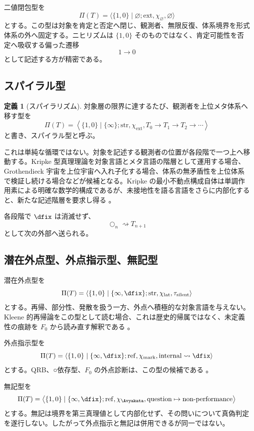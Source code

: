 \documentclass[a4paper,11pt]{ltjsarticle}
\theoremstyle{definition}
\newtheorem{definition}{定義}[section]
\theoremstyle{plain}
\newcommand{\Phase}{\Pi}
\begin{document}
二値閉包型を
\[
 \Phase(T)=
 \langle\{1,0\}\mid\varnothing;
 \mathrm{ext},\chi_{\varnothing},\varnothing\rangle
\]
とする。この型は対象を肯定と否定へ閉じ、観測者、無限反復、体系境界を形式体系の外へ固定する。ニヒリズムは $\{1,0\}$ そのものではなく、肯定可能性を否定へ吸収する偏った遷移
\[
 1\longrightarrow0
\]
として記述する方が精密である。

\subsection{スパイラル型}

\begin{definition}[スパイラリズム]
対象層の限界に達するたび、観測者を上位メタ体系へ移す型を
\[
 \Phase(T)=
 \left\langle
 \{1,0\}\mid\{\infty\};
 \mathrm{str},\chi_{\mathrm{ext}},
 T_0\to T_1\to T_2\to\cdots
 \right\rangle
\]
と書き、スパイラル型と呼ぶ。
\end{definition}

これは単純な循環ではない。対象を記述する観測者の位置が各段階で一つ上へ移動する。Kripke 型真理理論を対象言語とメタ言語の階層として運用する場合、Grothendieck 宇宙を上位宇宙へ入れ子化する場合、体系の無矛盾性を上位体系で検証し続ける場合などが候補となる。Kripke の最小不動点構成自体は単調作用素による明確な数学的構成であるが、未接地性を語る言語をさらに内部化すると、新たな記述階層を要求し得る \cite{kripke}。

各段階で $\dfix$ は消滅せず、
\[
 \bigcirc_n\rightsquigarrow T_{n+1}
\]
として次の外部へ送られる。

\subsection{潜在外点型、外点指示型、無記型}

潜在外点型を
\[
 \Phase(T)=
 \langle\{1,0\}\mid\{\infty,\dfix\};
 \mathrm{str},\chi_{\mathrm{lat}},\tau_{\mathrm{silent}}\rangle
\]
とする。再帰、部分性、発散を扱う一方、外点へ積極的な対象言語を与えない。Kleene 的再帰論をこの型として読む場合、これは歴史的帰属ではなく、未定義性の痕跡を $F_0$ から読み直す解釈である \cite{kleene}。

外点指示型を
\[
 \Phase(T)=
 \langle\{1,0\}\mid\{\infty,\dfix\};
 \mathrm{ref},\chi_{\mathrm{mark}},
 \mathrm{internal}\rightsquigarrow\dfix\rangle
\]
とする。QRB、○依存型、$F_0$ の外点診断は、この型の候補である \cite{ChibaQRB2026,ChibaEPMDTT2026,ChibaF02026}。

無記型を
\[
 \Phase(T)=
 \left\langle
 \{1,0\}\mid\{\infty,\dfix\};
 \mathrm{ref},\chi_{\Avyakata},
 \mathrm{question}\mapsto\mathrm{non\text{-}performance}
 \right\rangle
\]
とする。無記は境界を第三真理値として内部化せず、その問いについて真偽判定を遂行しない。したがって外点指示と無記は併用できるが同一ではない。
\end{document}
